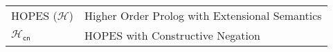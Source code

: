 \documentclass[inscr,ack,preface]{dithesis}
\theoremstyle{definition}
\newcommand{\hcn}{$\mathcal{H}_\mathsf{cn}$}
\begin{document}
\backmatter

\abbreviations
\begin{center}
	\renewcommand{\arraystretch}{1.5}
	\begin{longtable}{ l @{\qquad} l }
	\toprule
	  HOPES ($\mathcal{H}$)    & Higher Order Prolog with Extensional Semantics \\
    \hcn{}   & HOPES with Constructive Negation \\
	\bottomrule
	\end{longtable}
\end{center}

%
%
%



\end{document}
